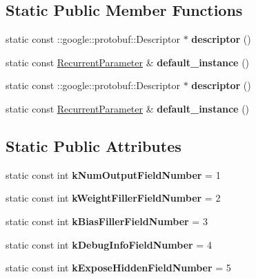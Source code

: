 \subsection*{Static Public Member Functions}
\begin{DoxyCompactItemize}
\item 
\mbox{\label{classcaffe_1_1_recurrent_parameter_a1e86472f22fce5e76ab99abff9d126ef}} 
static const \+::google\+::protobuf\+::\+Descriptor $\ast$ {\bfseries descriptor} ()
\item 
\mbox{\label{classcaffe_1_1_recurrent_parameter_a64abe0934db74c47ee13af3d6a2fa83e}} 
static const \mbox{\hyperlink{classcaffe_1_1_recurrent_parameter}{Recurrent\+Parameter}} \& {\bfseries default\+\_\+instance} ()
\item 
\mbox{\label{classcaffe_1_1_recurrent_parameter_aada0cb1e140fbd1d8d5174255550f2ee}} 
static const \+::google\+::protobuf\+::\+Descriptor $\ast$ {\bfseries descriptor} ()
\item 
\mbox{\label{classcaffe_1_1_recurrent_parameter_aa73a2cbc86337f870e3cf2da2394f008}} 
static const \mbox{\hyperlink{classcaffe_1_1_recurrent_parameter}{Recurrent\+Parameter}} \& {\bfseries default\+\_\+instance} ()
\end{DoxyCompactItemize}
\subsection*{Static Public Attributes}
\begin{DoxyCompactItemize}
\item 
\mbox{\label{classcaffe_1_1_recurrent_parameter_a570397242026824b6743ad81e4a7de2d}} 
static const int {\bfseries k\+Num\+Output\+Field\+Number} = 1
\item 
\mbox{\label{classcaffe_1_1_recurrent_parameter_aba57ac41dec5144cbcb17b4385988ece}} 
static const int {\bfseries k\+Weight\+Filler\+Field\+Number} = 2
\item 
\mbox{\label{classcaffe_1_1_recurrent_parameter_a00177c168adbc65b13f077cd1c484987}} 
static const int {\bfseries k\+Bias\+Filler\+Field\+Number} = 3
\item 
\mbox{\label{classcaffe_1_1_recurrent_parameter_a6c0742386d6d8fef8563fadcf66c742f}} 
static const int {\bfseries k\+Debug\+Info\+Field\+Number} = 4
\item 
\mbox{\label{classcaffe_1_1_recurrent_parameter_a365cf8616e0d4efc8ed8b0a6c140224d}} 
static const int {\bfseries k\+Expose\+Hidden\+Field\+Number} = 5
\end{DoxyCompactItemize}
